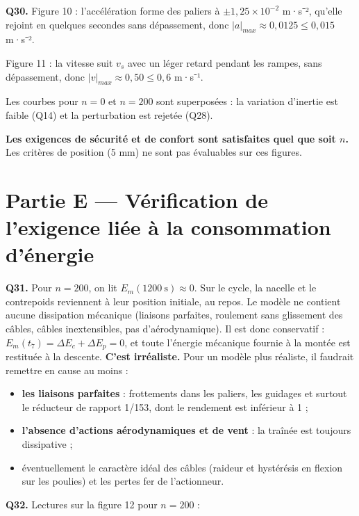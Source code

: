 \documentclass[11pt,a4paper]{article}
\providecommand{\tightlist}{\setlength{\itemsep}{0pt}\setlength{\parskip}{0pt}}
\begin{document}
\textbf{Q30.} Figure 10 : l'accélération forme des paliers à \(\pm1{,}25\times10^{-2}\) m·s⁻², qu'elle rejoint en quelques secondes sans dépassement, donc \(|a|_{max}\approx0{,}0125\leqslant0{,}015\) m·s⁻².

Figure 11 : la vitesse suit \(v_s\) avec un léger retard pendant les rampes, sans dépassement, donc \(|v|_{max}\approx0{,}50\leqslant0{,}6\) m·s⁻¹.

Les courbes pour \(n=0\) et \(n=200\) sont superposées : la variation d'inertie est faible (Q14) et la perturbation est rejetée (Q28).

\textbf{Les exigences de sécurité et de confort sont satisfaites quel que soit \(n\).} Les critères de position (5 mm) ne sont pas évaluables sur ces figures.

\hypertarget{partie-e-vuxe9rification-de-lexigence-liuxe9e-uxe0-la-consommation-duxe9nergie}{%
\section{Partie E --- Vérification de l'exigence liée à la consommation d'énergie}\label{partie-e-vuxe9rification-de-lexigence-liuxe9e-uxe0-la-consommation-duxe9nergie}}

\textbf{Q31.} Pour \(n=200\), on lit \(E_m(1200\ \text{s})\approx0\). Sur le cycle, la nacelle et le contrepoids reviennent à leur position initiale, au repos. Le modèle ne contient aucune dissipation mécanique (liaisons parfaites, roulement sans glissement des câbles, câbles inextensibles, pas d'aérodynamique). Il est donc conservatif : \(E_m(t_7)=\Delta E_c+\Delta E_p=0\), et toute l'énergie mécanique fournie à la montée est restituée à la descente. \textbf{C'est irréaliste.} Pour un modèle plus réaliste, il faudrait remettre en cause au moins :

\begin{itemize}
\tightlist
\item
  \textbf{les liaisons parfaites} : frottements dans les paliers, les guidages et surtout le réducteur de rapport 1/153, dont le rendement est inférieur à 1 ;
\item
  \textbf{l'absence d'actions aérodynamiques et de vent} : la traînée est toujours dissipative ;
\item
  éventuellement le caractère idéal des câbles (raideur et hystérésis en flexion sur les poulies) et les pertes fer de l'actionneur.
\end{itemize}

\textbf{Q32.} Lectures sur la figure 12 pour \(n=200\) :
\end{document}

